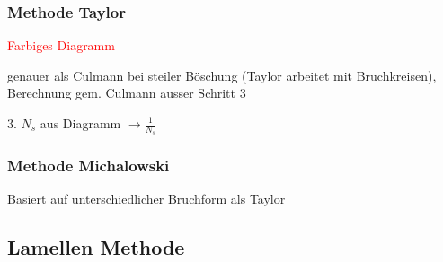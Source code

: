 \subsubsection{Methode Taylor}
\textcolor{red}{Farbiges Diagramm} \\
	\begin{minipage}{\linewidth}
		genauer als Culmann bei steiler Böschung (Taylor arbeitet mit Bruchkreisen), Berechnung gem. Culmann ausser Schritt 3
		
		\hspace{0.5cm} 3. $ N_s $ aus Diagramm $ \rightarrow \frac{1}{N_s} $
	\end{minipage}

\subsubsection{Methode Michalowski}
	\begin{minipage}{\linewidth}
		Basiert auf unterschiedlicher Bruchform als Taylor \\
	\end{minipage}





\subsection{Lamellen Methode}

